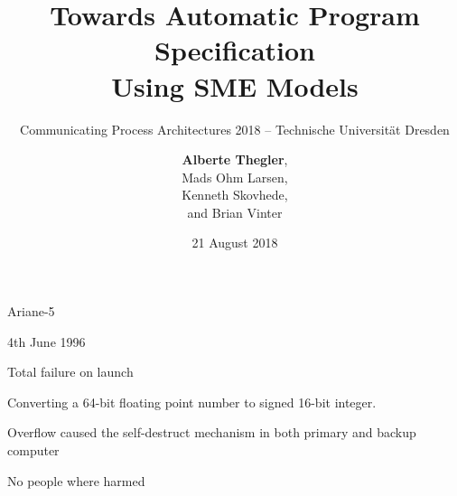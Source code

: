 \documentclass[13pt]{beamer}
\title[Towards Automatic Program Specification Using SME Models]{Towards Automatic Program Specification \\ Using SME Models}
\subtitle{\tiny Communicating Process Architectures 2018 -- Technische Universität Dresden}
\author[A. Thegler]
{\textbf{Alberte Thegler},\\
Mads Ohm Larsen,\\
Kenneth Skovhede,\\
and Brian Vinter\\
}
\institute[Niels Bohr Institute]{Niels Bohr Institute, University of Copenhagen, Denmark}
\date[August 21]{21 August 2018}
\newcommand{\cspm}{CSP$_M$}
\begin{document}
\frame[plain]{\titlepage}


%

\begin{frame}{Ariane-5}
  \begin{block}{}
    4th June 1996
  \end{block}

  \pause

  \begin{block}{}
     Total failure on launch
  \end{block}

  \pause

  \begin{block}{}
     Converting a 64-bit floating point number to signed 16-bit integer.
  \end{block}

  \pause

  \begin{block}{}
    Overflow caused the self-destruct mechanism in both primary and backup computer
  \end{block}

  \pause

  \begin{block}{}
     No people where harmed
  \end{block}

\end{frame}
\end{document}
